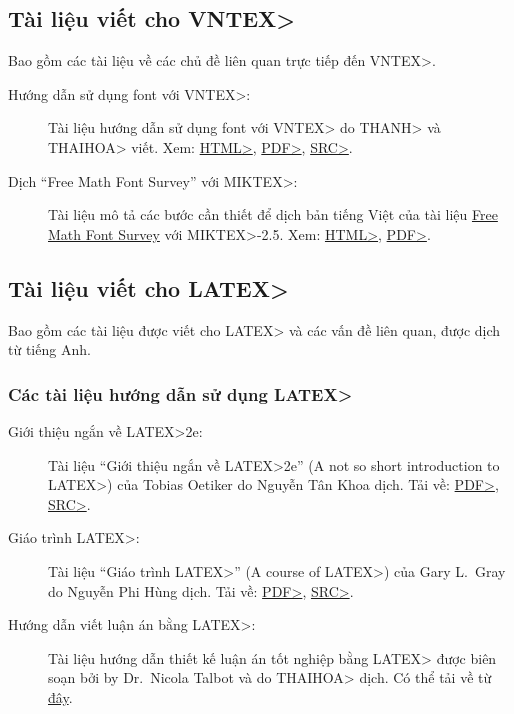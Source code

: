 \documentclass[12pt,a4paper]{article}
\begin{document}
\subsection{Tài liệu viết cho \<VNTEX>} 
\hypertarget{tai-lieu-vntex}{}
Bao gồm các tài liệu về các chủ đề liên quan trực tiếp đến \<VNTEX>.
\begin{description}
\item [Hướng dẫn sử dụng font với \<VNTEX>:]
Tài liệu hướng dẫn sử dụng font với \<VNTEX> do \<THANH> và \<THAIHOA>
viết. Xem:
\href{http://vntex.sf.net/doc/vn-fonts.html}{\<HTML>},
\href{http://vntex.sf.net/doc/vn-fonts.pdf}{\<PDF>},
\href{http://vntex.sf.net/doc/vn-fonts-src.zip}{\<SRC>}.

\item [Dịch ``Free Math Font Survey'' với \<MIKTEX>:]
Tài liệu mô tả các bước cần thiết để dịch bản tiếng Việt của tài liệu
\href{http://www.tug.org/tex-archive/info/Free_Math_Font_Survey/survey.html}
{Free Math Font Survey} với \<MIKTEX>-2.5. Xem:
\href{http://vntex.sf.net/doc/survey-vn-miktex.html}{\<HTML>},
\href{http://vntex.sf.net/doc/survey-vn-miktex.pdf}{\<PDF>}.
\end{description}


\subsection{Tài liệu viết cho \<LATEX>} 
Bao gồm các tài liệu được viết cho \<LATEX> và các vấn đề liên quan, được
dịch từ tiếng Anh.

\subsubsection{Các tài liệu hướng dẫn sử dụng \<LATEX>} 
\begin{description}
\item[Giới thiệu ngắn về \<LATEX>2e:]
Tài liệu ``Giới thiệu ngắn về \<LATEX>2e'' (A not so short
introduction to \<LATEX>) của Tobias Oetiker 
do Nguyễn Tân Khoa dịch. Tải về:
\href{http://vntex.sf.net/doc/lshort-vn.pdf}{\<PDF>},
\href{http://vntex.sf.net/doc/lshort-vn-src.zip}{\<SRC>}.

\item[Giáo trình \<LATEX>:]
Tài liệu ``Giáo trình \<LATEX>'' (A course of \<LATEX>) của Gary
L.~Gray do Nguyễn Phi Hùng dịch. Tải về:
\href{http://vntex.sf.net/doc/latex-course-vn.pdf}{\<PDF>},
\href{http://vntex.sf.net/doc/latex-course-vn-src.zip}{\<SRC>}.

\item[Hướng dẫn viết luận án bằng \<LATEX>:]
Tài liệu hướng dẫn thiết kế luận án tốt nghiệp bằng \<LATEX> được biên soạn bởi by
Dr.~Nicola Talbot và do \<THAIHOA> dịch. Có thể tải về từ
\href{http://theoval.cmp.uea.ac.uk/~nlct/latex/thesis_viet/index.html}{đây}.
\end{description}
\end{document}
